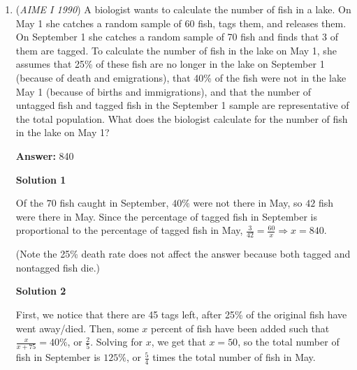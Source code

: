 \begin{enumerate}
 $\textbf{ Note: the smallest integer n which has 75 factors happens to be a multiple of 75 anyway  }$




\textbf{Solution 2}

We see that $n$ must have a prime factorization of $(z^2)(x^4)(k^4)$ since this will lead to $n$ having $75$ factors. $n$ has $(5^2)(3)$ as a factor. To minimize $n$ we can see that $z$ must be $5$ and either $x$ or $k$ will be $3$. We can let whichever the last variable is be $2$ to minimize and when we divide $n$ by $75$ the results is $(3^3)(2^4)$ or $\boxed{432}$.

 Note: the problem where this is linked is covered 0:40-1:40

 


	\item (\textit{AIME I 1990}) A biologist wants to calculate the number of fish in a lake. On May 1 she catches a random sample of 60 fish, tags them, and releases them. On September 1 she catches a random sample of 70 fish and finds that 3 of them are tagged. To calculate the number of fish in the lake on May 1, she assumes that 25\% of these fish are no longer in the lake on September 1 (because of death and emigrations), that 40\% of the fish were not in the lake May 1 (because of births and immigrations), and that the number of untagged fish and tagged fish in the September 1 sample are representative of the total population. What does the biologist calculate for the number of fish in the lake on May 1? 


 
 \textbf{Answer: }840



\textbf{Solution 1}

Of the $70$ fish caught in September, $40\%$ were not there in May, so $42$ fish were there in May. Since the percentage of tagged fish in September is proportional to the percentage of tagged fish in May, $\frac{3}{42} = \frac{60}{x} \Longrightarrow \boxed{x = 840}$.

 (Note the 25\% death rate does not affect the answer because both tagged and nontagged fish die.)

 



\textbf{Solution 2}

First, we notice that there are 45 tags left, after 25\% of the original fish have went away/died. Then, some $x$ percent of fish have been added such that $\frac{x}{x+75} = 40 \%$, or $\frac{2}{5}$. Solving for $x$, we get that $x = 50$, so the total number of fish in September is $125 \%$, or $\frac{5}{4}$ times the total number of fish in May.


\end{enumerate}
